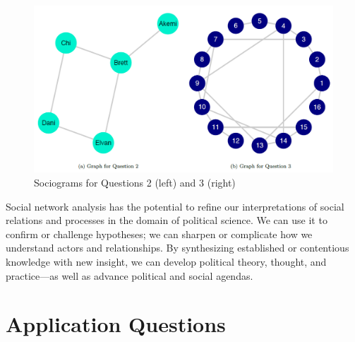 \documentclass{book}
\begin{document}
\begin{figure}
\centering
\includegraphics{images/social-networks/11-15.png}
\caption{Sociograms for Questions 2 (left) and 3 (right)}
\end{figure}

Social network analysis has the potential to refine our interpretations of
social relations and processes in the domain of political science. We can use
it to confirm or challenge hypotheses; we can sharpen or complicate how we
understand actors and relationships. By synthesizing established or
contentious knowledge with new insight, we can develop political theory,
thought, and practice---as well as advance political and social agendas.

\hypertarget{application-questions-8}{%
\section{Application Questions}\label{application-questions-8}}
\end{document}
